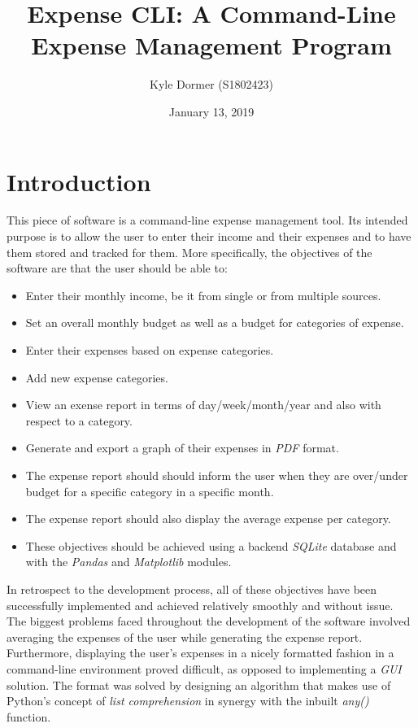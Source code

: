\documentclass[11pt]{article}
\title{Expense CLI: A Command-Line Expense Management Program}
\author{Kyle Dormer (S1802423)}
\date{January 13, 2019}
\begin{document}
  \maketitle
  \tableofcontents
  \newpage

  \section{Introduction}
  This piece of software is a command-line expense management tool. Its intended purpose is to allow the user to enter their income and their expenses and to have them stored and tracked for them. More specifically, the objectives of the software are that the user should be able to:
  \begin{itemize}
    \item Enter their monthly income, be it from single or from multiple sources.
    \item Set an overall monthly budget as well as a budget for categories of expense.
    \item Enter their expenses based on expense categories.
    \item Add new expense categories.
    \item View an exense report in terms of day/week/month/year and also with respect to a category.
    \item Generate and export a graph of their expenses in \textit{PDF} format.
    \item The expense report should should inform the user when they are over/under budget for a specific category in a specific month.
    \item The expense report should also display the average expense per category.
    \item These objectives should be achieved using a backend \textit{SQLite} database and with the \textit{Pandas} and \textit{Matplotlib} modules.
  \end{itemize}
  In retrospect to the development process, all of these objectives have been successfully implemented and achieved relatively smoothly and without issue. The biggest problems faced throughout the development of the software involved averaging the expenses of the user while generating the expense report. Furthermore, displaying the user's expenses in a nicely formatted fashion in a command-line environment proved difficult, as opposed to implementing a \textit{GUI} solution. The format was solved by designing an algorithm that makes use of Python's concept of \textit{list comprehension} in synergy with the inbuilt \textit{any()} function.
\end{document}
